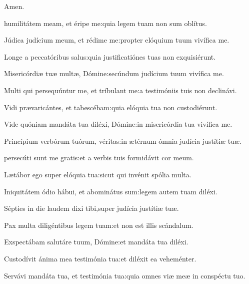 \begin{multicols}{2}
\begin{flushright}
Amen.
\end{flushright}




\Normal

 humilitátem meam, et éripe me\thinspace:\GreStarNbsp quia legem tuam non sum oblítus.

Júdica judícium meum, et rédime me\thinspace:\GreStarNbsp propter elóquium tuum vivífica me.

Longe a peccatóribus salus\thinspace:\GreStarNbsp quia justificatiónes tuas non exquisiérunt.

Misericórdiæ tuæ multæ, Dómine\thinspace:\GreStarNbsp secúndum judícium tuum vivífica me.

Multi qui persequúntur me, et tríbulant me\thinspace:\GreStarNbsp a testimóniis tuis non declinávi.

Vidi prævaricántes, et tabescébam\thinspace:\GreStarNbsp quia elóquia tua non custodiérunt.

Vide quóniam mandáta tua diléxi, Dómine\thinspace:\GreStarNbsp in misericórdia tua vivífica me.

Princípium verbórum tuórum, véritas\thinspace:\GreStarNbsp in ætérnum ómnia judícia justítiæ tuæ.


\Normal

 persecúti sunt me gratis\thinspace:\GreStarNbsp et a verbis tuis formidávit cor meum.

Lætábor ego super elóquia tua\thinspace:\GreStarNbsp sicut qui invénit spólia multa.

Iniquitátem ódio hábui, et abominátus sum\thinspace:\GreStarNbsp legem autem tuam diléxi.

Sépties in die laudem dixi tibi,\GreStarNbsp super judícia justítiæ tuæ.

Pax multa diligéntibus legem tuam\thinspace:\GreStarNbsp et non est illis scándalum.

Exspectábam salutáre tuum, Dómine\thinspace:\GreStarNbsp et mandáta tua diléxi.

Custodívit ánima mea testimónia tua\thinspace:\GreStarNbsp et diléxit ea veheménter.

Servávi mandáta tua, et testimónia tua\thinspace:\GreStarNbsp quia omnes viæ meæ in conspéctu tuo.



\end{multicols}
